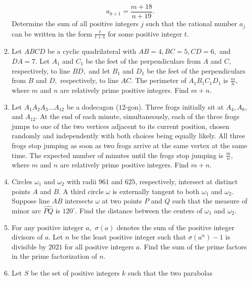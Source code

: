 \documentclass{article}
\begin{document}
\begin{enumerate}[label=\arabic*., itemsep=0.5em]
\begin{equation*}
a_{k+1} = \frac{m + 18}{n+19}.
\end{equation*}
Determine the sum of all positive integers $j$ such that the rational number $a_j$ can be written in the form $\frac{t}{t+1}$ for some positive integer $t$.\par \vspace{0.5em}\item Let $ABCD$ be a cyclic quadrilateral with $AB=4,BC=5,CD=6,$ and $DA=7.$ Let $A_1$ and $C_1$ be the feet of the perpendiculars from $A$ and $C,$ respectively, to line $BD,$ and let $B_1$ and $D_1$ be the feet of the perpendiculars from $B$ and $D,$ respectively, to line $AC.$ The perimeter of $A_1B_1C_1D_1$ is $\frac mn,$ where $m$ and $n$ are relatively prime positive integers. Find $m+n.$\par \vspace{0.5em}\item Let $A_1A_2A_3\ldots A_{12}$ be a dodecagon ($12$-gon). Three frogs initially sit at $A_4,A_8,$ and $A_{12}$. At the end of each minute, simultaneously, each of the three frogs jumps to one of the two vertices adjacent to its current position, chosen randomly and independently with both choices being equally likely. All three frogs stop jumping as soon as two frogs arrive at the same vertex at the same time. The expected number of minutes until the frogs stop jumping is $\frac mn$, where $m$ and $n$ are relatively prime positive integers. Find $m+n$.\par \vspace{0.5em}\item Circles $\omega_1$ and $\omega_2$ with radii $961$ and $625$, respectively, intersect at distinct points $A$ and $B$. A third circle $\omega$ is externally tangent to both $\omega_1$ and $\omega_2$. Suppose line $AB$ intersects $\omega$ at two points $P$ and $Q$ such that the measure of minor arc $\widehat{PQ}$ is $120^{\circ}$. Find the distance between the centers of $\omega_1$ and $\omega_2$.\par \vspace{0.5em}\item For any positive integer $a,$ $\sigma(a)$ denotes the sum of the positive integer divisors of $a$. Let $n$ be the least positive integer such that $\sigma(a^n)-1$ is divisible by $2021$ for all positive integers $a$. Find the sum of the prime factors in the prime factorization of $n$.\par \vspace{0.5em}\item Let $S$ be the set of positive integers $k$ such that the two parabolas

\end{enumerate}
\end{document}
